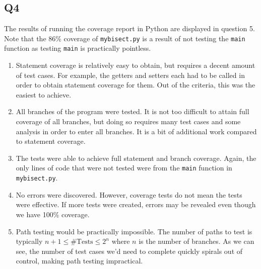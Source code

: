 \documentclass[12pt, letterpaper, titlepage]{article}
\begin{document}
\subsection*{Q4}
The results of running the coverage report in Python are displayed in question 5. Note that the 86\% coverage of \lstinline{mybisect.py} is a result of not testing the \lstinline{main} function as testing \lstinline{main} is practically pointless.
\begin{enumerate}
    \item Statement coverage is relatively easy to obtain, but requires a decent amount of test cases. For example, the getters and setters each had to be called in order to obtain statement coverage for them. Out of the criteria, this was the easiest to achieve.
    \item All branches of the program were tested. It is not too difficult to attain full coverage of all branches, but doing so requires many test cases and some analysis in order to enter all branches. It is a bit of additional work compared to statement coverage.
    \item The tests were able to achieve full statement and branch coverage. Again, the only lines of code that were not tested were from the \lstinline{main} function in \lstinline{mybisect.py}.
    \item No errors were discovered. However, coverage tests do not mean the tests were effective. If more tests were created, errors may be revealed even though we have 100\% coverage.
    \item Path testing would be practically impossible. The number of paths to test is typically $n+1 \leq \text{\#Tests} \leq 2^n$ where $n$ is the number of branches. As we can see, the number of test cases we'd need to complete quickly spirals out of control, making path testing impractical. 
\end{enumerate}
\end{document}
